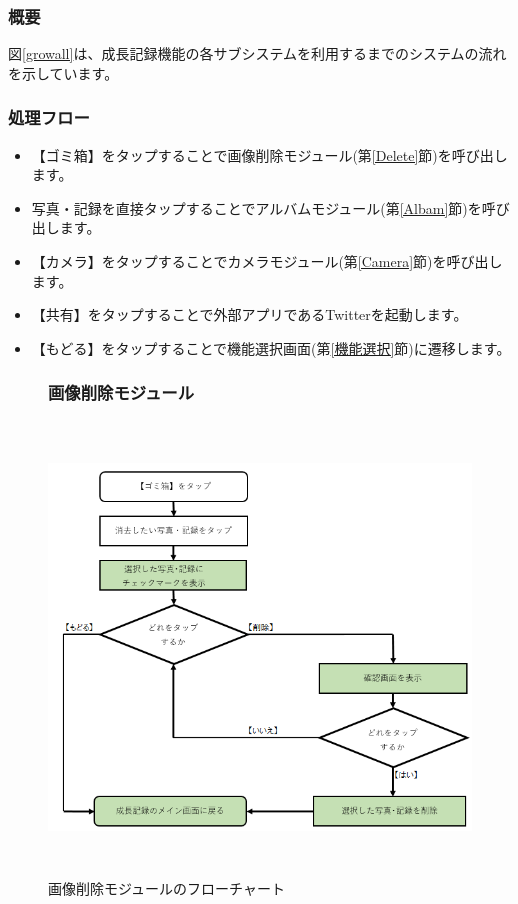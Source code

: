 \documentclass[a4j]{jarticle}
\begin{document}
\subsubsection*{概要}
図\ref{growall}は、成長記録機能の各サブシステムを利用するまでのシステムの流れを示しています。

\subsubsection*{処理フロー}
\begin{itemize}
\item 【ゴミ箱】をタップすることで画像削除モジュール(第\ref{Delete}節)を呼び出します。

\item 写真・記録を直接タップすることでアルバムモジュール(第\ref{Albam}節)を呼び出します。

\item 【カメラ】をタップすることでカメラモジュール(第\ref{Camera}節)を呼び出します。

\item 【共有】をタップすることで外部アプリであるTwitterを起動します。

\item 【もどる】をタップすることで機能選択画面(第\ref{機能選択}節)に遷移します。
\end{itemize}

\newpage


\begin{figure}[lh]
\subsubsection{画像削除モジュール\label{Delete}}
    \begin{flushleft}
    \includegraphics[height = 12.0cm]{delete.png}
    \caption {画像削除モジュールのフローチャート}
    \label{delete}
    \end{flushleft}
\end{figure}
\end{document}
